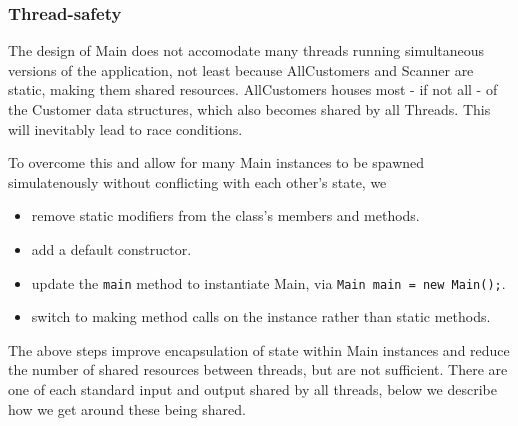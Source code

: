 \subsubsection{Thread-safety}
The design of Main does not accomodate many threads running simultaneous versions of the application, not least because AllCustomers and Scanner are static, making them shared resources. AllCustomers houses most - if not all - of the Customer data structures, which also becomes shared by all Threads. This will inevitably lead to race conditions. 
\par 
To overcome this and allow for many Main instances to be spawned simulatenously without conflicting with each other's state, we 
\begin{itemize}[noitemsep]
	\item remove static modifiers from the class's members and methods.  
	\item add a default constructor.
	\item update the \lstinline{main} method to instantiate Main, via \lstinline{Main main = new Main();}.
	\item switch to making method calls on the instance rather than static methods. 
\end{itemize}
The above steps improve encapsulation of state within Main instances and reduce the number of shared resources between threads, but are not sufficient. There are one of each standard input and output shared by all threads, below we describe how we get around these being shared. 

